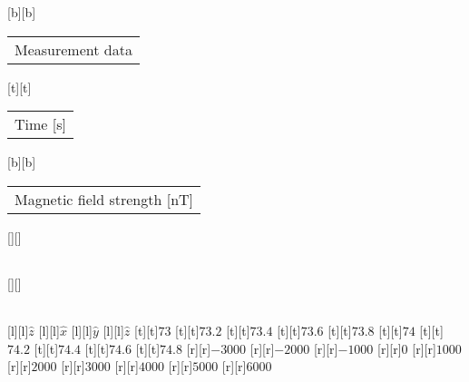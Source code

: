 %
%
[b][b]{\fontsize{8}{12}\selectfont \setlength{\tabcolsep}{0pt}\begin{tabular}{c}Measurement data\end{tabular}}%
[t][t]{\fontsize{8}{12}\selectfont \setlength{\tabcolsep}{0pt}\begin{tabular}{c}Time [s]\end{tabular}}%
[b][b]{\fontsize{8}{12}\selectfont \setlength{\tabcolsep}{0pt}\begin{tabular}{c}Magnetic field strength [nT]\end{tabular}}%
[][]{\fontsize{8}{12}\selectfont \setlength{\tabcolsep}{0pt}\begin{tabular}{c} \end{tabular}}%
[][]{\fontsize{8}{12}\selectfont \setlength{\tabcolsep}{0pt}\begin{tabular}{c} \end{tabular}}%
[l][l]{\fontsize{6}{8}\selectfont $\hat{z}$}%
[l][l]{\fontsize{6}{8}\selectfont $\hat{x}$}%
[l][l]{\fontsize{6}{8}\selectfont $\hat{y}$}%
[l][l]{\fontsize{6}{8}\selectfont $\hat{z}$}%
%
\fontsize{6}{8}%
\selectfont%
%
[t][t]{$73$}%
[t][t]{$73.2$}%
[t][t]{$73.4$}%
[t][t]{$73.6$}%
[t][t]{$73.8$}%
[t][t]{$74$}%
[t][t]{$74.2$}%
[t][t]{$74.4$}%
[t][t]{$74.6$}%
[t][t]{$74.8$}%
%
[r][r]{$-3000$}%
[r][r]{$-2000$}%
[r][r]{$-1000$}%
[r][r]{$0$}%
[r][r]{$1000$}%
[r][r]{$2000$}%
[r][r]{$3000$}%
[r][r]{$4000$}%
[r][r]{$5000$}%
[r][r]{$6000$}%
%
%
